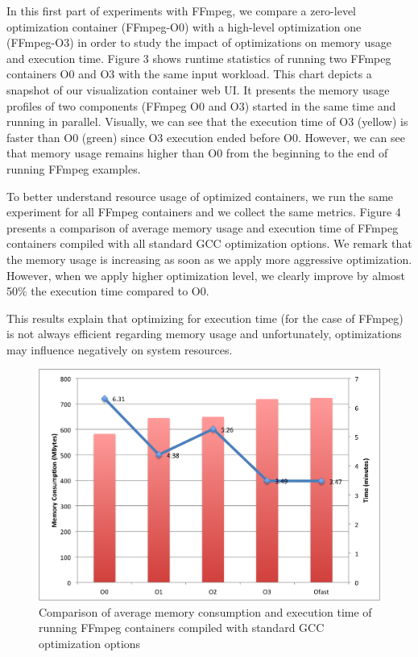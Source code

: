 In this first part of experiments with FFmpeg, we compare a zero-level optimization container (FFmpeg-O0) with a high-level optimization one (FFmpeg-O3) in order to study the impact of optimizations on memory usage and execution time. Figure 3 shows runtime statistics of running two FFmpeg containers O0 and O3 with the same input workload. This chart depicts a snapshot of our visualization container web UI. It presents the memory usage profiles of two components (FFmpeg O0 and O3) started in the same time and running in parallel. Visually, we can see that the execution time of O3 (yellow) is faster than O0 (green) since O3 execution ended before O0. However, we can see that memory usage remains higher than O0 from the beginning to the end of running FFmpeg examples. 

To better understand resource usage of optimized containers, we run the same experiment for all FFmpeg containers and we collect the same metrics. Figure 4 presents a comparison of average memory usage and execution time of FFmpeg containers compiled with all standard GCC optimization options. We remark that the memory usage is increasing as soon as we apply more aggressive optimization. However, when we apply higher optimization level, we clearly improve by almost 50\% the execution time compared to O0.

This results explain that optimizing for execution time (for the case of FFmpeg) is not always efficient regarding memory usage and unfortunately, optimizations may influence negatively on system resources.
\begin{figure}[h]
	\centering
	\includegraphics[scale=0.5]{Ressources/infra_ffmpeg_plot1.png}
	\caption{Comparison of average memory consumption and execution time of running FFmpeg containers compiled with standard GCC optimization options}
\end{figure}


